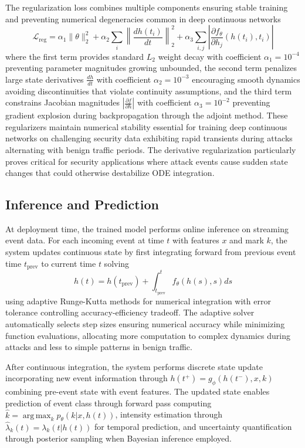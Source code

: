 \documentclass[10pt,journal,compsoc]{IEEEtran}
\DeclareMathOperator*{\argmax}{arg\,max}
\begin{document}
The regularization loss combines multiple components ensuring stable training and preventing numerical degeneracies common in deep continuous networks
\begin{equation}
\mathcal{L}_{\text{reg}} = \alpha_1 \|\theta\|_2^2 + \alpha_2 \sum_{i} \left\|\frac{dh(t_i)}{dt}\right\|_2^2 + \alpha_3 \sum_{i,j} \left|\frac{\partial f_\theta}{\partial h_j}(h(t_i), t_i)\right|
\end{equation}
where the first term provides standard $L_2$ weight decay with coefficient $\alpha_1 = 10^{-4}$ preventing parameter magnitudes growing unbounded, the second term penalizes large state derivatives $\frac{dh}{dt}$ with coefficient $\alpha_2 = 10^{-3}$ encouraging smooth dynamics avoiding discontinuities that violate continuity assumptions, and the third term constrains Jacobian magnitudes $|\frac{\partial f}{\partial h}|$ with coefficient $\alpha_3 = 10^{-2}$ preventing gradient explosion during backpropagation through the adjoint method. These regularizers maintain numerical stability essential for training deep continuous networks on challenging security data exhibiting rapid transients during attacks alternating with benign traffic periods. The derivative regularization particularly proves critical for security applications where attack events cause sudden state changes that could otherwise destabilize ODE integration.

\subsection{Inference and Prediction}

At deployment time, the trained model performs online inference on streaming event data. For each incoming event at time $t$ with features $x$ and mark $k$, the system updates continuous state by first integrating forward from previous event time $t_{\text{prev}}$ to current time $t$ solving
\begin{equation}
h(t) = h(t_{\text{prev}}) + \int_{t_{\text{prev}}}^t f_\theta(h(s), s) ds
\end{equation}
using adaptive Runge-Kutta methods for numerical integration with error tolerance controlling accuracy-efficiency tradeoff. The adaptive solver automatically selects step sizes ensuring numerical accuracy while minimizing function evaluations, allocating more computation to complex dynamics during attacks and less to simple patterns in benign traffic.

After continuous integration, the system performs discrete state update incorporating new event information through $h(t^+) = g_\phi(h(t^-), x, k)$ combining pre-event state with event features. The updated state enables prediction of event class through forward pass computing $\hat{k} = \argmax_k p_\theta(k | x, h(t))$, intensity estimation through $\hat{\lambda}_k(t) = \lambda_k(t | h(t))$ for temporal prediction, and uncertainty quantification through posterior sampling when Bayesian inference employed.
\end{document}
